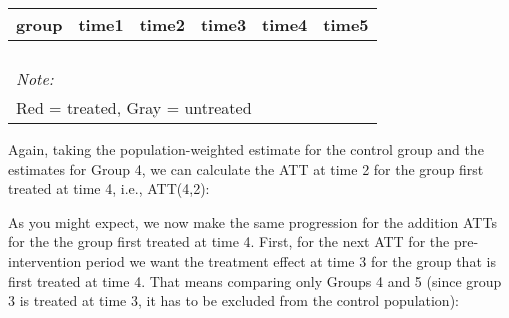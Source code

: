 \documentclass[
]{article}
\begin{document}
\begin{table}
\centering
\begin{tabular}[t]{>{}r|>{}r|>{}r|>{}r|>{}r|>{}r}
\hline
group & time1 & time2 & time3 & time4 & time5\\
\hline
\cellcolor{white}{2} & \cellcolor{white}{\textcolor{black}{0.631}} & \cellcolor{white}{\textcolor{black}{0.711}} & \cellcolor{white}{0.814} & \cellcolor{white}{0.846} & \cellcolor{white}{0.826}\\
\hline
\cellcolor{white}{3} & \cellcolor{lightgray}{\textcolor{black}{0.678}} & \cellcolor{lightgray}{\textcolor{black}{0.770}} & \cellcolor{white}{0.664} & \cellcolor{white}{0.800} & \cellcolor{white}{0.784}\\
\hline
\cellcolor{white}{4} & \cellcolor{red}{\textcolor{black}{0.778}} & \cellcolor{red}{\textcolor{black}{0.807}} & \cellcolor{white}{0.673} & \cellcolor{white}{0.750} & \cellcolor{white}{0.868}\\
\hline
\cellcolor{white}{5} & \cellcolor{lightgray}{\textcolor{black}{0.854}} & \cellcolor{lightgray}{\textcolor{black}{0.939}} & \cellcolor{white}{0.854} & \cellcolor{white}{0.800} & \cellcolor{white}{0.855}\\
\hline
\multicolumn{6}{l}{\rule{0pt}{1em}\textit{Note: }}\\
\multicolumn{6}{l}{\rule{0pt}{1em}Red = treated, Gray = untreated}\\
\end{tabular}
\end{table}

Again, taking the population-weighted estimate for the control group and
the estimates for Group 4, we can calculate the ATT at time 2 for the
group first treated at time 4, i.e., ATT(4,2):

As you might expect, we now make the same progression for the addition
ATTs for the the group first treated at time 4. First, for the next ATT
for the pre-intervention period we want the treatment effect at time 3
for the group that is first treated at time 4. That means comparing only
Groups 4 and 5 (since group 3 is treated at time 3, it has to be
excluded from the control population):
\end{document}
